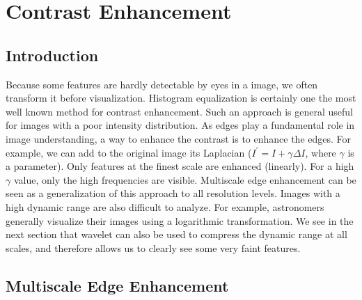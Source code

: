 \newpage

\section{Contrast Enhancement}
\label{sec_contrast}

\subsection{Introduction}
Because some features are hardly detectable by eyes in a image, we
often transform it before visualization. Histogram equalization is
certainly one the most well known method for contrast enhancement.
Such an approach is general useful for images
with a poor  intensity distribution. As edges play a fundamental 
role in image understanding, a way to enhance the contrast is to 
enhance the edges. For example, we can add to the original image its Laplacian
($I^{'}= I + \gamma \Delta I$, where $\gamma$ is a parameter). Only
features at the finest scale are enhanced (linearly). For a high 
$\gamma$ value, only the high frequencies are visible.
Multiscale edge enhancement \cite{col:velde99} can be seen 
as a generalization of this approach to all resolution levels.  
Images with a high dynamic range are also 
difficult to analyze. For example, astronomers generally visualize their
images using a logarithmic transformation. We see in the next
section that wavelet can also be used to compress the dynamic range
at all scales, and therefore allows us to clearly see some very faint
features.

\subsection{Multiscale Edge Enhancement}
